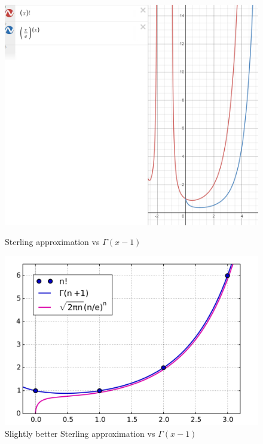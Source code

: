 \documentclass[11pt]{article}
\numberwithin{equation}{section}
\numberwithin{equation}{section}
\begin{document}
\begin{figure}[H]
  \includegraphics[width=.9\linewidth]{image3.png}
  \caption{Sterling approximation vs $\Gamma(x-1)$ }\label{fig:13}
\endminipage\hfill
{}
  \includegraphics[width=0.9\linewidth]{image2.png}
  \caption{Slightly better Sterling approximation vs $\Gamma(x-1)$}\label{fig:14}
\endminipage\hfill
\end{figure}
\end{document}
